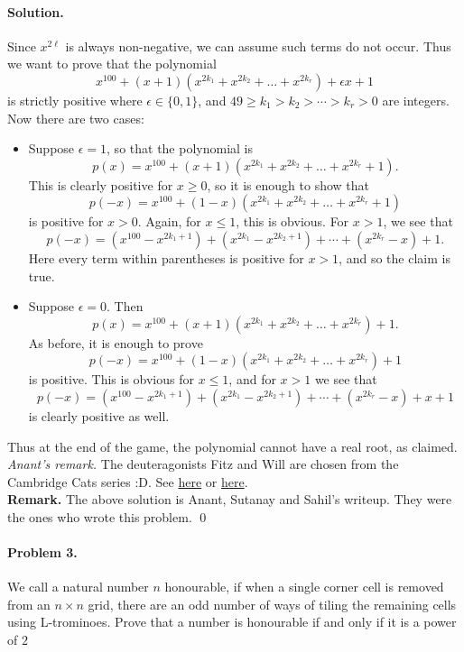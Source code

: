 \documentclass[12pt]{article}
\newenvironment{solution}
{\paragraph{Solution.}}
{\qed\eject}
\begin{document}
\begin{solution}
    Since $x^{2\ell}$ is always non-negative, we can assume such terms do not occur. Thus we want to prove that the polynomial$$x^{100}+(x+1)(x^{2k_1}+x^{2k_2}+\ldots+x^{2k_r})+\epsilon x+1$$is strictly positive where $\epsilon\in \{0,1\}$, and $49\ge k_1>k_2>\cdots> k_r>0$ are integers. Now there are two cases:
    \begin{itemize}
        \item Suppose $\epsilon=1$, so that the polynomial is$$p(x)=x^{100}+(x+1)(x^{2k_1}+x^{2k_2}+\ldots+x^{2k_r}+1).$$This is clearly positive for $x\ge 0$, so it is enough to show that$$p(-x)=x^{100}+(1-x)(x^{2k_1}+x^{2k_2}+\ldots+x^{2k_r}+1)$$is positive for $x>0$. Again, for $x\le 1$, this is obvious. For $x>1$, we see that$$p(-x)=(x^{100}-x^{2k_1+1})+(x^{2k_1}-x^{2k_2+1})+\cdots+(x^{2k_r}-x)+1.$$Here every term within parentheses is positive for $x>1$, and so the claim is true.
        \item Suppose $\epsilon=0$. Then$$p(x)=x^{100}+(x+1)(x^{2k_1}+x^{2k_2}+\ldots+x^{2k_r})+1.$$As before, it is enough to prove$$p(-x)=x^{100}+(1-x)(x^{2k_1}+x^{2k_2}+\ldots+x^{2k_r})+1$$is positive. This is obvious for $x\le 1$, and for $x>1$ we see that$$p(-x)=(x^{100}-x^{2k_1+1})+(x^{2k_1}-x^{2k_2+1})+\cdots+(x^{2k_r}-x)+x+1$$is clearly positive as well.
    \end{itemize}

Thus at the end of the game, the polynomial cannot have a real root, as claimed.\\

\textit{Anant's remark.} The deuteragonists Fitz and Will are chosen from the Cambridge Cats series :D. See \href{https://www.alumni.cam.ac.uk/file/fitz-and-will-the-cambridge-cats}{here} or \href{http://www.fitzandwill.com/fitz-and-will/}{here}.\\

\textbf{Remark.} The above solution is Anant, Sutanay and Sahil's writeup. They were the ones who wrote this problem.
\end{solution}

\paragraph{\textbf{Problem 3.}} We call a natural number $n$ honourable, if when a single corner cell is removed from an $n \times n$ grid, there are an odd number of ways of tiling the remaining cells using L-trominoes. Prove that a number is honourable if and only if it is a power of $2$
\end{document}
